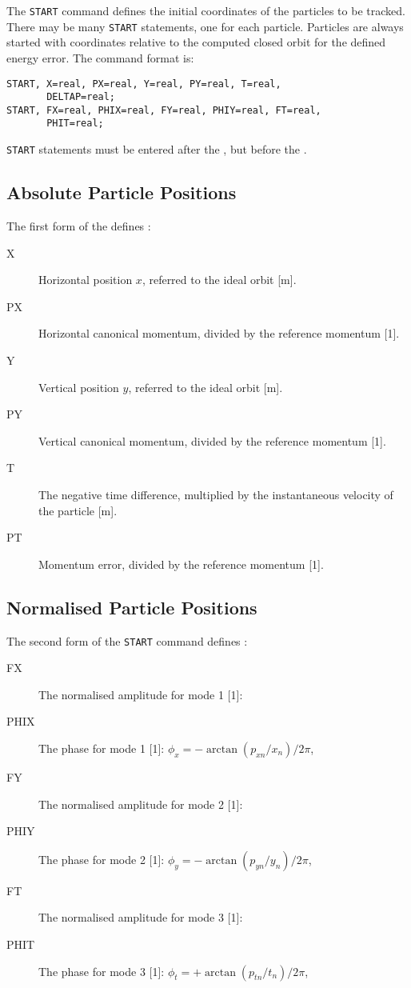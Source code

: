 The \texttt{START} command defines the initial coordinates of
the particles to be tracked.
There may be many \texttt{START} statements, one for each particle.
Particles are always started with coordinates relative
to the computed closed orbit for the defined energy error.
The command format is:
\begin{verbatim}
START, X=real, PX=real, Y=real, PY=real, T=real, 
       DELTAP=real;
START, FX=real, PHIX=real, FY=real, PHIY=real, FT=real, 
       PHIT=real;
\end{verbatim}
\texttt{START} statements must be entered after the
,
but before the .

\subsection{Absolute Particle Positions}
The first form of the  defines 
:
\begin{description}
\item[X]
  Horizontal position $x$, referred to the ideal orbit [m].
\item[PX]
  Horizontal canonical momentum, divided by the reference momentum [1].
\item[Y]
  Vertical position $y$, referred to the ideal orbit [m].
\item[PY]
  Vertical canonical momentum, divided by the reference momentum [1].
\item[T]
  The negative time difference, 
  multiplied by the instantaneous velocity of the particle [m].
\item[PT]
  Momentum error, divided by the reference momentum [1].
\end{description}

\subsection{Normalised Particle Positions}
The second form of the \texttt{START} command defines 
:
\begin{description}
\item[FX]
  The normalised amplitude for mode 1 [1]:
\item[PHIX]
  The phase for mode 1 [1]:
  $\phi_x = - \arctan(p_{xn}/x_n) / 2 \pi$,
\item[FY]
  The normalised amplitude for mode 2 [1]:
\item[PHIY]
  The phase for mode 2 [1]:
  $\phi_y = - \arctan(p_{yn}/y_n) / 2 \pi$,
\item[FT]
  The normalised amplitude for mode 3 [1]:
\item[PHIT]
  The phase for mode 3 [1]:
  $\phi_t = + \arctan(p_{tn}/t_n) / 2 \pi$,
\end{description}

